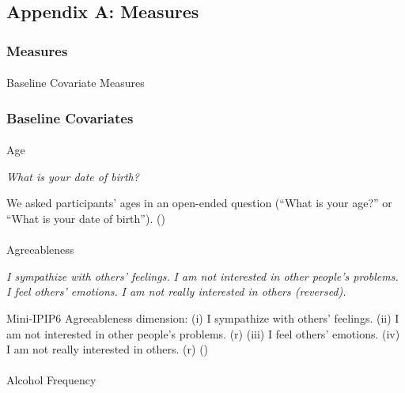 \documentclass[
  single column]{article}
\makeatletter
\let\oldparagraph\paragraph
\renewcommand{\paragraph}{
    \@ifstar
      \xxxParagraphStar
      \xxxParagraphNoStar
  }
\newcommand{\xxxParagraphStar}[1]{\oldparagraph*{#1}\mbox{}}
\newcommand{\xxxParagraphNoStar}[1]{\oldparagraph{#1}\mbox{}}
\makeatother
\begin{document}
\newpage{}

\subsection{Appendix A: Measures}\label{appendix-measures}

\subsubsection{Measures}\label{measures}

\paragraph{Baseline Covariate
Measures}\label{baseline-covariate-measures}

\subsubsection{Baseline Covariates}\label{baseline-covariates}

\paragraph{Age}\label{age}

\emph{What is your date of birth?}

We asked participants' ages in an open-ended question (``What is your
age?'' or ``What is your date of birth'').
()

\paragraph{Agreeableness}\label{agreeableness}

\emph{I sympathize with others' feelings.} \emph{I am not interested in
other people's problems.} \emph{I feel others' emotions.} \emph{I am not
really interested in others (reversed).}

Mini-IPIP6 Agreeableness dimension: (i) I sympathize with others'
feelings. (ii) I am not interested in other people's problems. (r) (iii)
I feel others' emotions. (iv) I am not really interested in others. (r)
()

\paragraph{Alcohol Frequency}\label{alcohol-frequency}
\end{document}
